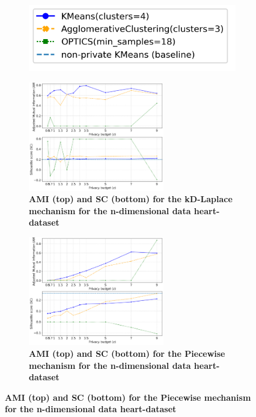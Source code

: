 \begin{figure}[H]
  \centering
  \begin{subfigure}{0.30\textwidth}
    \includegraphics[width=\textwidth]{Results/kd-laplace/kd-Laplace/heart-dataset/legend_9.png}
  \end{subfigure}
  \begin{subfigure}{1\textwidth}
    \caption{\textbf{AMI (top) and SC (bottom) for the kD-Laplace mechanism for the n-dimensional data heart-dataset}}
    \centering
    \includegraphics[width=0.65\textwidth]{Results/kd-laplace/kd-Laplace/heart-dataset/ami-and-sc_9_dimensions.png}
    \centering
  \end{subfigure}
  \begin{subfigure}{1\textwidth}
    \caption{\textbf{AMI (top) and SC (bottom) for the Piecewise mechanism for the n-dimensional data heart-dataset}}
    \centering
    \includegraphics[width=0.65\textwidth]{Results/kd-laplace/piecewise/heart-dataset/ami-and-sc_9_dimensions.png}
  \end{subfigure}
  \label{fig:validation-heart-dataset_comparison_nd-laplace}
\end{figure}
